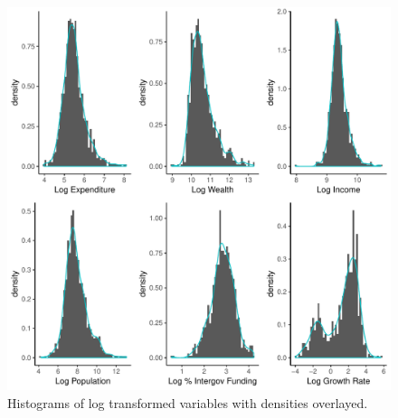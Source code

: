 \documentclass{article}\usepackage[]{graphicx}\usepackage[]{color}
\makeatletter
\def\maxwidth{ %
  \ifdim\Gin@nat@width>\linewidth
    \linewidth
  \else
    \Gin@nat@width
  \fi
}
\newenvironment{knitrout}{}{} %
\makeatother
\begin{document}
\begin{appendices}
\begin{knitrout}
\color{fgcolor}\begin{figure}
\includegraphics[width=\maxwidth]{figure/r_append_log_hist-1} \caption[Histograms of log transformed variables with densities overlayed]{Histograms of log transformed variables with densities overlayed.}\label{fig:r append_log_hist}
\end{figure}


\end{knitrout}



\end{appendices}
\end{document}
